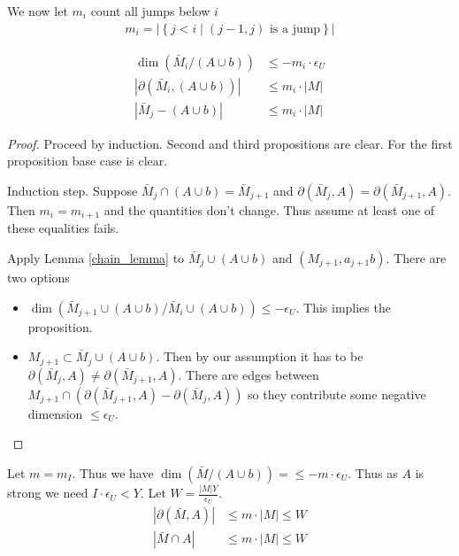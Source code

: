 \documentclass{amsart}
\newcommand{\curly}[1]{\left\{#1\right\}}
\newcommand{\abs}[1]{\left|#1\right|}
\begin{document}
\begin{Definition}
	We now let $m_i$ count all jumps below $i$
	\begin{align*}
		m_i = \abs{\curly{j < i \mid (j-1, j) \text{ is a jump}}}
	\end{align*}
\end{Definition}

\begin{Lemma}
	\begin{align*}
		\dim(\bar M_i / (A \cup b)) &\leq -m_i \cdot \epsilon_U \\
		|\partial(\bar M_i, (A \cup b))| &\leq m_i \cdot |M| \\
		|\bar M_j - (A \cup b)| &\leq m_i \cdot |M|
	\end{align*}
\end{Lemma}

\begin{proof}
	Proceed by induction.
	Second and third propositions are clear.
	For the first proposition base case is clear.
	
	Induction step.
	Suppose $\bar M_j \cap (A \cup b) = \bar M_{j+1}$ and $\partial(\bar M_j, A) = \partial(\bar M_{j+1}, A)$.
	Then $m_i = m_{i+1}$ and the quantities don't change.
	Thus assume at least one of these equalities fails.
	
	Apply Lemma \ref{chain_lemma} to $\bar M_j \cup (A \cup b)$ and $(M_{j+1}, a_{j+1}b)$.
	There are two options
	
	\begin{itemize}
		\item $\dim(\bar M_{j+1} \cup (A \cup b) / \bar M_i \cup (A \cup b)) \leq -\epsilon_U$.
		This implies the proposition.
		\item $M_{j+1} \subset \bar M_j \cup (A \cup b)$.
		Then by our assumption it has to be $\partial(\bar M_j, A) \neq \partial(\bar M_{j+1}, A)$.
		There are edges between $M_{j+1} \cap (\partial(\bar M_{j+1}, A) - \partial(\bar M_j, A))$ so they contribute some negative dimension $\leq \epsilon_U$.
	\end{itemize}
\end{proof}

Let $m = m_I$.
Thus we have $\dim(\bar M / (A \cup b)) = \leq -m \cdot \epsilon_U $.
Thus as $A$ is strong we need $I \cdot \epsilon_U < Y$.
Let $W = \frac{|M|Y}{\epsilon_U}$.
\begin{align*}
	|\partial(\bar M, A)| &\leq m \cdot |M| \leq W \\
	|\bar M \cap A| &\leq m \cdot |M| \leq W
\end{align*}
\end{document}
